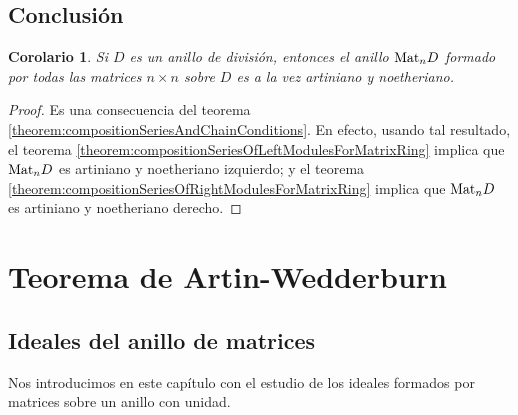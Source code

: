 \documentclass{report}
\newcommand{\Mat}{\textnormal{Mat}}
\newtheorem{corollary}{Corolario}
\begin{document}
  \section{Conclusión}

  \begin{corollary}
    \label{corollary:matrixRingIsArtinianAndNoetherian}
    Si \(D\) es un anillo de división, entonces el anillo \(\Mat_n D\) formado por todas las matrices \(n \times n\) sobre \(D\) es a la vez artiniano y noetheriano.
  \end{corollary}
  \begin{proof}
    Es una consecuencia del teorema \ref{theorem:compositionSeriesAndChainConditions}.
    En efecto, usando tal resultado, el teorema \ref{theorem:compositionSeriesOfLeftModulesForMatrixRing} implica que \(\Mat_n D\) es artiniano y noetheriano izquierdo; y el teorema \ref{theorem:compositionSeriesOfRightModulesForMatrixRing} implica que \(\Mat_n D\) es artiniano y noetheriano derecho.
  \end{proof}

  \chapter{Teorema de Artin-Wedderburn}

  \section{Ideales del anillo de matrices}

  Nos introducimos en este capítulo con el estudio de los ideales formados por matrices sobre un anillo con unidad.
\end{document}
